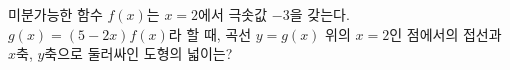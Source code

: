 미분가능한 함수 $f(x)$는 $x=2$에서 극솟값 $-3$을 갖는다. $g(x)=(5-2x)f(x)$라 할 때, 곡선 $y=g(x)$ 위의 $x=2$인 점에서의 접선과 $x$축, $y$축으로 둘러싸인 도형의 넓이는?
